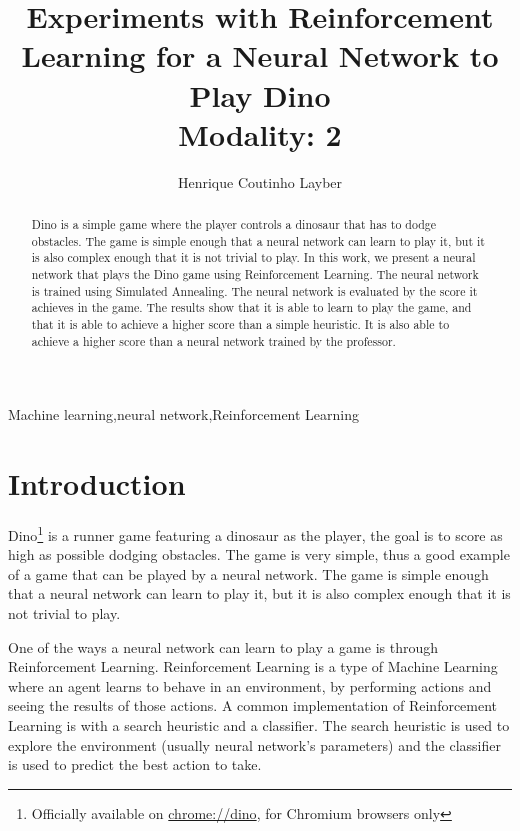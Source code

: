 \documentclass[review]{elsarticle}
\begin{document}
\begin{frontmatter}

\title{Experiments with Reinforcement Learning for a Neural Network to Play Dino\\Modality: 2}

\author{Henrique Coutinho Layber}
\address{Vitória, Espírito Santo, Brazil}

\begin{abstract}

Dino is a simple game where the player controls a dinosaur that has to dodge obstacles. The game is simple enough that a neural network can learn to play it, but it is also complex enough that it is not trivial to play. In this work, we present a neural network that plays the Dino game using Reinforcement Learning. The neural network is trained using Simulated Annealing. The neural network is evaluated by the score it achieves in the game. The results show that it is able to learn to play the game, and that it is able to achieve a higher score than a simple heuristic. It is also able to achieve a higher score than a neural network trained by the professor.

\end{abstract}

\begin{keyword}
Machine learning\sep neural network\sep Reinforcement Learning
\end{keyword}

\end{frontmatter}

\linenumbers

\section{Introduction}

Dino\footnote{Officially available on \url{chrome://dino}, for Chromium browsers only} is a runner game featuring a dinosaur as the player, the goal is to score as high as possible dodging obstacles. The game is very simple, thus a good example of a game that can be played by a neural network. The game is simple enough that a neural network can learn to play it, but it is also complex enough that it is not trivial to play.

One of the ways a neural network can learn to play a game is through Reinforcement Learning. Reinforcement Learning is a type of Machine Learning where an agent learns to behave in an environment, by performing actions and seeing the results of those actions. A common implementation of Reinforcement Learning is with a search heuristic and a classifier. The search heuristic is used to explore the environment (usually neural network's parameters) and the classifier is used to predict the best action to take.
\end{document}
